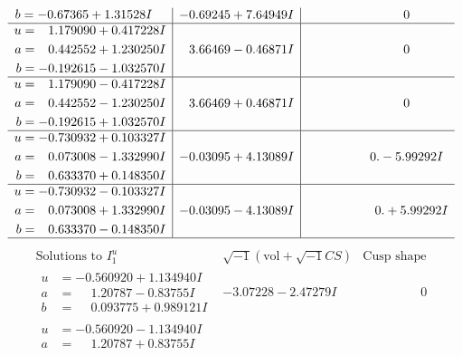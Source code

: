 \documentclass[1p]{elsarticle_modified}
\theoremstyle{definition}
\newcommand{\I}{\sqrt{-1}}
\begin{document}
$$\begin{array}{c|c|c}
\begin{aligned}
b &= -0.67365 + 1.31528 I\end{aligned}
 & -0.69245 + 7.64949 I & \phantom{-0.000000 } 0 \\ \hline\begin{aligned}
u &= \phantom{-}1.179090 + 0.417228 I \\
a &= \phantom{-}0.442552 + 1.230250 I \\
b &= -0.192615 - 1.032570 I\end{aligned}
 & \phantom{-}3.66469 - 0.46871 I & \phantom{-0.000000 } 0 \\ \hline\begin{aligned}
u &= \phantom{-}1.179090 - 0.417228 I \\
a &= \phantom{-}0.442552 - 1.230250 I \\
b &= -0.192615 + 1.032570 I\end{aligned}
 & \phantom{-}3.66469 + 0.46871 I & \phantom{-0.000000 } 0 \\ \hline\begin{aligned}
u &= -0.730932 + 0.103327 I \\
a &= \phantom{-}0.073008 - 1.332990 I \\
b &= \phantom{-}0.633370 + 0.148350 I\end{aligned}
 & -0.03095 + 4.13089 I & \phantom{-0.000000 } 0. - 5.99292 I \\ \hline\begin{aligned}
u &= -0.730932 - 0.103327 I \\
a &= \phantom{-}0.073008 + 1.332990 I \\
b &= \phantom{-}0.633370 - 0.148350 I\end{aligned}
 & -0.03095 - 4.13089 I & \phantom{-0.000000 -}0. + 5.99292 I\\
 \hline 
 \end{array}$$\newpage$$\begin{array}{c|c|c}  
\text{Solutions to }I^u_{1}& \I (\text{vol} + \sqrt{-1}CS) & \text{Cusp shape}\\
 \hline 
\begin{aligned}
u &= -0.560920 + 1.134940 I \\
a &= \phantom{-}1.20787 - 0.83755 I \\
b &= \phantom{-}0.093775 + 0.989121 I\end{aligned}
 & -3.07228 - 2.47279 I & \phantom{-0.000000 } 0 \\ \hline\begin{aligned}
u &= -0.560920 - 1.134940 I \\
a &= \phantom{-}1.20787 + 0.83755 I \\

\end{aligned}
\end{array}$$
\end{document}
